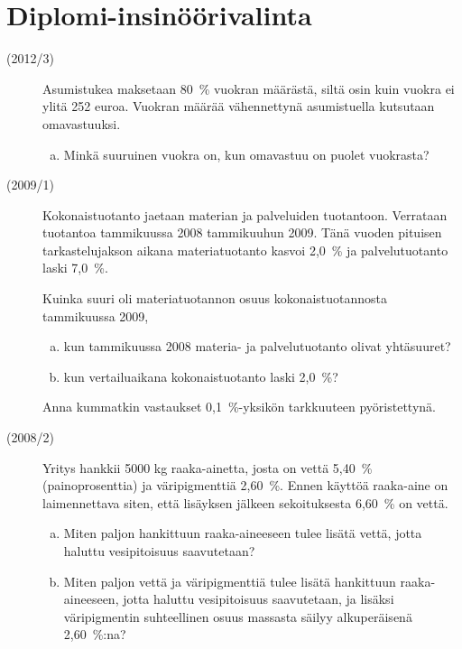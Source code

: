 \section{Diplomi-insinöörivalinta}
\begin{description}
	\item[(2012/3)] Asumistukea maksetaan 80~\% vuokran määrästä, siltä osin kuin
        vuokra ei ylitä 252 euroa. Vuokran määrää vähennettynä asumistuella
        kutsutaan omavastuuksi.
        
		\begin{enumerate}[(a)]
			\item Minkä suuruinen vuokra on, kun omavastuu on puolet vuokrasta?
		\end{enumerate}
	
	\item[(2009/1)] Kokonaistuotanto jaetaan materian ja palveluiden tuotantoon.
        Verrataan tuotantoa tammikuussa 2008 tammikuuhun 2009. Tänä vuoden pituisen
        tarkastelujakson aikana materiatuotanto kasvoi 2,0~\% ja palvelutuotanto laski 7,0~\%.
	
	   Kuinka suuri oli materiatuotannon osuus kokonaistuotannosta tammikuussa 2009,
	   
    	\begin{enumerate}[(a)]
    		\item kun tammikuussa 2008 materia- ja palvelutuotanto olivat yhtäsuuret?
    		\item kun vertailuaikana kokonaistuotanto laski 2,0~\%?
    	\end{enumerate}
    	
	   Anna kummatkin vastaukset 0,1~\%-yksikön tarkkuuteen pyöristettynä.

	\item[(2008/2)] Yritys hankkii 5000 kg raaka-ainetta, josta on vettä 5,40~\%
        (painoprosenttia) ja väripigmenttiä 2,60~\%. Ennen käyttöä raaka-aine on
        laimennettava siten, että lisäyksen jälkeen sekoituksesta 6,60~\% on vettä.
	
    	\begin{enumerate}[(a)]
    		\item Miten paljon hankittuun raaka-aineeseen tulee lisätä vettä,
                jotta haluttu vesipitoisuus saavutetaan?
    		\item Miten paljon vettä ja väripigmenttiä tulee lisätä hankittuun
                raaka-aineeseen, jotta haluttu vesipitoisuus saavutetaan, ja lisäksi
                väripigmentin suhteellinen osuus massasta säilyy alkuperäisenä 2,60~\%:na?
    	\end{enumerate}
    	

\end{description}
